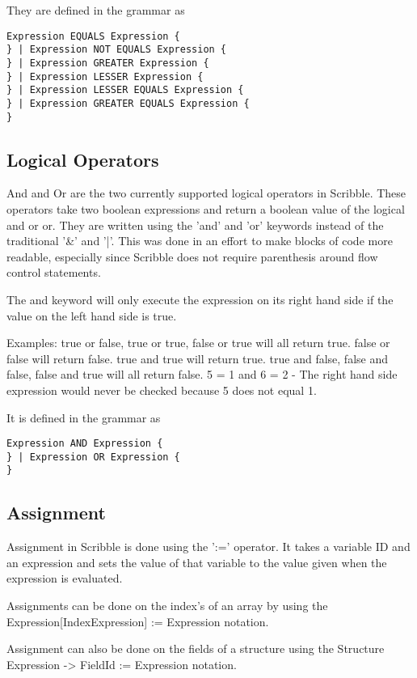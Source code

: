 \documentclass[]{final_report}
\begin{document}
They are defined in the grammar as \begin{verbatim}
Expression EQUALS Expression {
} | Expression NOT EQUALS Expression {
} | Expression GREATER Expression {
} | Expression LESSER Expression {
} | Expression LESSER EQUALS Expression {
} | Expression GREATER EQUALS Expression {
}
\end{verbatim}

\subsection{Logical Operators}

And and Or are the two currently supported logical operators in Scribble. These operators take two boolean expressions and return a boolean value of the logical and or or. They are written using the 'and' and 'or' keywords instead of the traditional '\&' and '|'. This was done in an effort to make blocks of code more readable, especially since Scribble does not require parenthesis around flow control statements.

The and keyword will only execute the expression on its right hand side if the value on the left hand side is true.

Examples:
true or false, true or true, false or true will all return true.
false or false will return false.
true and true will return true.
true and false, false and false, false and true will all return false.
5 = 1 and 6 = 2 - The right hand side expression would never be checked because 5 does not equal 1.

It is defined in the grammar as
\begin{verbatim}
Expression AND Expression {
} | Expression OR Expression {
}
\end{verbatim}

\subsection{Assignment}

Assignment in Scribble is done using the ':=' operator. It takes a variable ID and an expression and sets the value of that variable to the value given when the expression is evaluated.

Assignments can be done on the index's of an array by using the Expression[IndexExpression] := Expression notation.

Assignment can also be done on the fields of a structure using the Structure Expression -> FieldId := Expression notation. 
\end{document}
